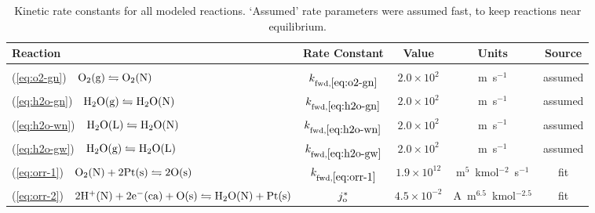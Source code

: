 \documentclass[final,3p,times,twocolumn]{elsarticle}    %
\begin{document}
\begin{table}[!ht]
    \small
    \centering
    \caption{Kinetic rate constants for all modeled reactions. `Assumed' rate parameters were assumed fast, to keep reactions near equilibrium.}
    \vspace*{1mm}
    
    \begin{tabular}{l c c c c}
    \hline \hline
    Reaction &Rate Constant               &Value         &Units      &Source \\
    \hline \vspace*{-3mm} \\
    (\ref{eq:o2-gn}) \,\, ${\rm O_2(g) \leftrightharpoons O_2(N)}$ &$k_{\rm fwd,\ref{eq:o2-gn}}$   &$2.0\times10^{2}$ &m~s$^{-1}$ &assumed\\
    (\ref{eq:h2o-gn}) \,\, ${\rm H_2O(g) \leftrightharpoons H_2O(N)}$ &$k_{\rm fwd,\ref{eq:h2o-gn}}$ &$2.0\times10^{2}$ &m~s$^{-1}$ &assumed\\
    (\ref{eq:h2o-wn}) \,\, ${\rm H_2O(L) \leftrightharpoons H_2O(N)}$ &$k_{\rm fwd,\ref{eq:h2o-wn}}$ &$2.0\times10^{2}$ &m~s$^{-1}$ &assumed\\
    (\ref{eq:h2o-gw}) \,\, ${\rm H_2O(g) \leftrightharpoons H_2O(L)}$ &$k_{\rm fwd,\ref{eq:h2o-gw}}$ &$2.0\times10^{2}$ &m~s$^{-1}$ &assumed\\
    (\ref{eq:orr-1}) \,\, ${\rm O_2(N) + 2Pt(s) \leftrightharpoons 2O(s)}$ & $k_{\rm fwd,\ref{eq:orr-1}}$ &$1.9\times10^{12}$ &m$^5$~kmol$^{-2}$~s$^{-1}$ &fit\\
    (\ref{eq:orr-2}) \,\, ${\rm 2H^{+}(N) + 2e^{-}(ca) + O(s) \leftrightharpoons H_2O(N) + Pt(s)}$ &$j_{\rm o}^{*}$ &$4.5\times10^{-2}$ &A~m$^{6.5}$~kmol$^{-2.5}$ &fit\\
    \hline \hline
    \end{tabular}
    \label{tab:kinetics}
\end{table}
\end{document}

